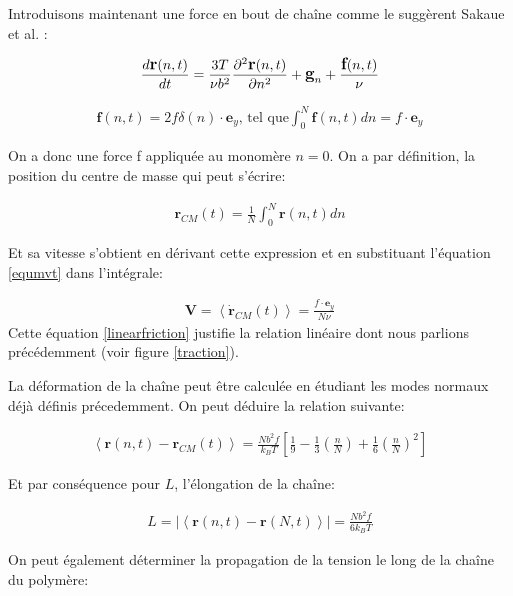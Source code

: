 \documentclass[a4paper,11pt]{article}
\begin{document}
Introduisons maintenant une force en bout de chaîne comme le suggèrent Sakaue et al. \cite{Sakaue2012}:

\begin{eqnarray}
\large{
\frac{d \textbf{r}(n,t)}{dt} =  \frac{3T}{\nu b^2}\frac{\partial ^2 \textbf{r}(n,t)}{\partial  n^2} + \textbf{g}_n} + \frac{\textbf{f}(n,t)}{\nu}
\label{equmvt}
\end{eqnarray}

\begin{eqnarray}
\textbf{f}(n,t) = 2f\delta(n)\cdot\textbf{e}_{y} \text{, tel que} \int_{0}^{N} \textbf{f}(n,t) dn = f \cdot \textbf{e}_{y} 
\end{eqnarray}

On a donc une force f appliquée au monomère $n=0$. On a par définition, la position du centre de masse qui peut s'écrire: 

\begin{eqnarray}
\mathbf{r}_{CM}(t) = \frac{1}{N}\int_{0}^{N} \textbf{r}(n,t) dn
\end{eqnarray}

Et sa vitesse s'obtient en dérivant cette expression et en substituant l'équation \ref{equmvt} dans l'intégrale:


\begin{eqnarray}
\textbf{V} = \left<\mathbf{\dot{r}}_{CM}(t)\right> = \frac{f \cdot \textbf{e}_{y}}{N\nu} 
\label{linearfriction}
\end{eqnarray}
Cette équation \ref{linearfriction} justifie la relation linéaire dont nous parlions précédemment (voir figure \ref{traction}).

La déformation de la chaîne peut être calculée en étudiant les modes normaux déjà définis précedemment. On peut déduire la relation suivante:


\begin{eqnarray}
\left<\mathbf{r}(n,t)-\mathbf{r}_{CM}(t)\right> = \frac{Nb^2f}{k_BT}\left[\frac{1}{9}-\frac{1}{3}\left(\frac{n}{N}\right)+\frac{1}{6}\left(\frac{n}{N}\right)^2\right] 
\label{distmonom}
\end{eqnarray}

Et par conséquence pour $L$, l'élongation de la chaîne: 

\begin{eqnarray}
L=|\left<\mathbf{r}(n,t)-\mathbf{r}(N,t)\right> | = \frac{Nb^2f}{6k_BT} 
\end{eqnarray}

On peut également déterminer la propagation de la tension le long de la chaîne du polymère:
\end{document}
